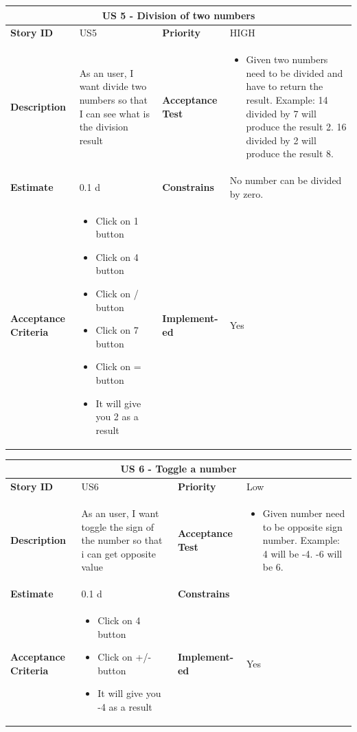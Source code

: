 \documentclass{article}
\begin{document}
\begin{tabular}{ |p{2cm}|p{5cm}|p{2cm}|p{4cm}| }
 \hline
 \multicolumn{4}{|c|}{US 5 - Division of two numbers} \\
 \hline
 \textbf {Story ID}& US5 &  \textbf{Priority} & HIGH \\
 \hline
  \textbf{Description}   & As an user, I want divide two numbers so that I can see what is the division result &    \textbf{Acceptance Test}& 
\begin{itemize}
\item Given two numbers need to be divided and have to return the result. Example: 14 divided by 7 will produce the result 2. 16 divided by 2 will produce the result 8. 
\end{itemize}
  \\
 \hline
 \textbf{Estimate} & 0.1 d &  \textbf{Constrains}&  No number can be divided by zero. \\
 \hline
 \textbf{Acceptance Criteria} & 
 \begin{itemize}
\item Click on 1 button
\item Click on 4 button
\item Click on / button
\item Click on 7 button
\item Click on = button
\item It will give you 2 as a result 
\end{itemize}
 &  \textbf{Implement- ed}& Yes  \\
 \hline
\end{tabular}

\begin{tabular}{ |p{2cm}|p{5cm}|p{2cm}|p{4cm}| }
 \hline
 \multicolumn{4}{|c|}{US 6 - Toggle a number} \\
 \hline
 \textbf {Story ID}& US6 &  \textbf{Priority} & Low \\
 \hline
  \textbf{Description}   & As an user, I want toggle the sign of the number so that i can get opposite value &    \textbf{Acceptance Test}& 
\begin{itemize}
\item Given number need to be opposite sign number. Example: 4 will be -4.   -6 will be 6. 
\end{itemize}
  \\
 \hline
 \textbf{Estimate} & 0.1 d &  \textbf{Constrains}&   \\
 \hline
 \textbf{Acceptance Criteria} & 
 \begin{itemize}
\item Click on 4 button
\item Click on +/- button
\item It will give you -4 as a result 
\end{itemize}
 &  \textbf{Implement- ed}& Yes  \\
 \hline
\end{tabular}
\end{document}
